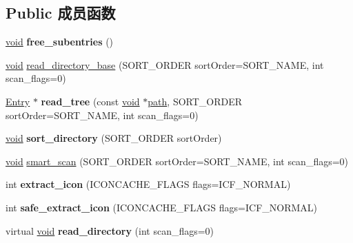 \subsection*{Public 成员函数}
\begin{DoxyCompactItemize}
\item 
\mbox{\label{struct_entry_a3d12df727ac63b6aa78371c7e214273e}} 
\hyperlink{interfacevoid}{void} {\bfseries free\+\_\+subentries} ()
\item 
\hyperlink{interfacevoid}{void} \hyperlink{struct_entry_a60b0ecb89c8f4d79f5401b892b3ac190}{read\+\_\+directory\+\_\+base} (S\+O\+R\+T\+\_\+\+O\+R\+D\+ER sort\+Order=S\+O\+R\+T\+\_\+\+N\+A\+ME, int scan\+\_\+flags=0)
\item 
\mbox{\label{struct_entry_abb32cbf83a19acc0c4e29e1b9d809202}} 
\hyperlink{struct_entry}{Entry} $\ast$ {\bfseries read\+\_\+tree} (const \hyperlink{interfacevoid}{void} $\ast$\hyperlink{structpath}{path}, S\+O\+R\+T\+\_\+\+O\+R\+D\+ER sort\+Order=S\+O\+R\+T\+\_\+\+N\+A\+ME, int scan\+\_\+flags=0)
\item 
\mbox{\label{struct_entry_a26396ac0773b36c0c4d3ed4b165ac21d}} 
\hyperlink{interfacevoid}{void} {\bfseries sort\+\_\+directory} (S\+O\+R\+T\+\_\+\+O\+R\+D\+ER sort\+Order)
\item 
\hyperlink{interfacevoid}{void} \hyperlink{struct_entry_ac7af5ff20fa83e4962caf8e59e1ee437}{smart\+\_\+scan} (S\+O\+R\+T\+\_\+\+O\+R\+D\+ER sort\+Order=S\+O\+R\+T\+\_\+\+N\+A\+ME, int scan\+\_\+flags=0)
\item 
\mbox{\label{struct_entry_a9b1a2a587274e3a7bc229f98b16e4744}} 
int {\bfseries extract\+\_\+icon} (I\+C\+O\+N\+C\+A\+C\+H\+E\+\_\+\+F\+L\+A\+GS flags=I\+C\+F\+\_\+\+N\+O\+R\+M\+AL)
\item 
\mbox{\label{struct_entry_ae5401cf583fa727c09937f040d4e3f60}} 
int {\bfseries safe\+\_\+extract\+\_\+icon} (I\+C\+O\+N\+C\+A\+C\+H\+E\+\_\+\+F\+L\+A\+GS flags=I\+C\+F\+\_\+\+N\+O\+R\+M\+AL)
\item 
\mbox{\label{struct_entry_a5506dc6d29a4d159de5c8b5cb0197f31}} 
virtual \hyperlink{interfacevoid}{void} {\bfseries read\+\_\+directory} (int scan\+\_\+flags=0)
\item 
\mbox{\label{struct_entry_adc142050e4b1348926858bb51fd9bac9}} 

\end{DoxyCompactItemize}
